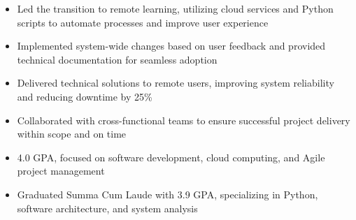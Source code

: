 \par\smallskip
\noindent
\begin{minipage}{20cm}
  \begin{minipage}{9.75cm}
    \begin{itemize}
      \item Led the transition to remote learning, utilizing cloud services and Python scripts to automate processes and improve user experience
      \item Implemented system-wide changes based on user feedback and provided technical documentation for seamless adoption
    \end{itemize}
  \end{minipage}
  \hfill
  \begin{minipage}{9.75cm}
    \begin{itemize}
      \item Delivered technical solutions to remote users, improving system reliability and reducing downtime by 25\%
      \item Collaborated with cross-functional teams to ensure successful project delivery within scope and on time
    \end{itemize}
  \end{minipage}
\end{minipage}

\begin{itemize}
  \item 4.0 GPA, focused on software development, cloud computing, and Agile project management
\end{itemize}
\divider

\begin{itemize}
  \item Graduated Summa Cum Laude with 3.9 GPA, specializing in Python, software architecture, and system analysis
\end{itemize}

\noindent
\begin{minipage}{20cm}
\end{minipage}


